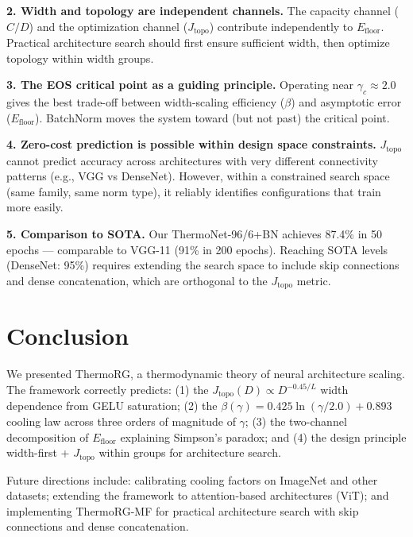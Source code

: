 \documentclass[11pt, a4paper]{article}
\theoremstyle{plain}
\begin{document}
\textbf{2. Width and topology are independent channels.} The capacity channel ($C/D$) and the optimization channel ($J_{\mathrm{topo}}$) contribute independently to $E_{\mathrm{floor}}$. Practical architecture search should first ensure sufficient width, then optimize topology within width groups.

\textbf{3. The EOS critical point as a guiding principle.} Operating near $\gamma_c \approx 2.0$ gives the best trade-off between width-scaling efficiency ($\beta$) and asymptotic error ($E_{\mathrm{floor}}$). BatchNorm moves the system toward (but not past) the critical point.

\textbf{4. Zero-cost prediction is possible within design space constraints.} $J_{\mathrm{topo}}$ cannot predict accuracy across architectures with very different connectivity patterns (e.g., VGG vs DenseNet). However, within a constrained search space (same family, same norm type), it reliably identifies configurations that train more easily.

\textbf{5. Comparison to SOTA.} Our ThermoNet-96/6+BN achieves 87.4\% in 50 epochs --- comparable to VGG-11 (91\% in 200 epochs). Reaching SOTA levels (DenseNet: 95\%) requires extending the search space to include skip connections and dense concatenation, which are orthogonal to the $J_{\mathrm{topo}}$ metric.

\section{Conclusion}

We presented ThermoRG, a thermodynamic theory of neural architecture scaling. The framework correctly predicts: (1) the $J_{\mathrm{topo}}(D) \propto D^{-0.45/L}$ width dependence from GELU saturation; (2) the $\beta(\gamma) = 0.425\ln(\gamma/2.0) + 0.893$ cooling law across three orders of magnitude of $\gamma$; (3) the two-channel decomposition of $E_{\mathrm{floor}}$ explaining Simpson's paradox; and (4) the design principle width-first + $J_{\mathrm{topo}}$ within groups for architecture search.

Future directions include: calibrating cooling factors on ImageNet and other datasets; extending the framework to attention-based architectures (ViT); and implementing ThermoRG-MF for practical architecture search with skip connections and dense concatenation.
\end{document}
